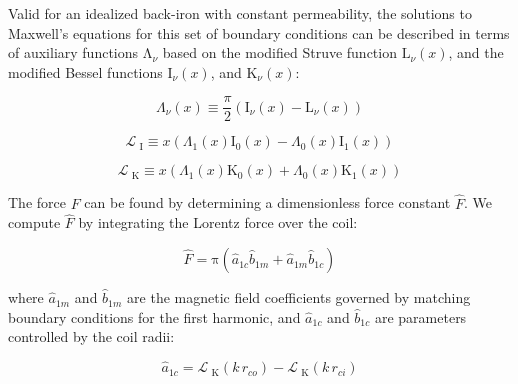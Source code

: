         Valid for an idealized back-iron with constant permeability, the solutions to Maxwell's equations for this set of boundary conditions can be described in terms of auxiliary functions ${\mathrm\Lambda}_{\nu}$ based on the modified Struve function ${\mathrm{L}_{\nu}}(x)$, and the modified Bessel functions ${\mathrm I}_{\nu}(x)$, and ${\mathrm K}_{\nu}(x)$:
        
        
        \begin{equation}
            {\Lambda_{\nu}}\left( x \right) \equiv \frac{\pi }{2}\left( {{\mathrm{I}_{\nu}}\left( x \right) - {\mathrm{L}_{\nu}}\left( x \right)} \right)
            \label{eq:Axiliary function}
        \end{equation}
        
        \begin{equation}
            {\mathcal{L}_{{\textrm{ I}}}} \equiv x\left( {{\Lambda _1}\left( x \right){\mathrm{I}_0}\left( x \right) - {\Lambda _0}\left( x \right){\mathrm{I}_1}\left( x \right)} \right)
            \label{eq:bessel function 1}
        \end{equation}
        
        \begin{equation}
            {\mathcal{L}_{{\textrm{ K}}}} \equiv x\left( {{\Lambda _1}\left( x \right){\mathrm{K}_0}\left( x \right) + {\Lambda _0}\left( x \right){\mathrm{K}_1}\left( x \right)} \right)
            \label{eq:bessel function 2}
        \end{equation}
        
        
        The force $F$ can be found by determining a dimensionless force constant $\hat F$. We compute $\hat F$ by integrating the Lorentz force over the coil:
        
        
        \begin{equation}
            \hat{F}=\mathrm\pi\left({\hat{a}}_{1c}{\hat{b}}_{1m}+{\hat{a}}_{1m}{\hat{b}}_{1c}\right)
            \label{eq:force dimless}
        \end{equation}
        
        
        where ${\hat a}_{1m}$ and ${\hat b}_{1m}$ are the magnetic field coefficients governed by matching boundary conditions for the first harmonic, and ${\hat a}_{1c}$ and ${\hat b}_{1c}$ are parameters controlled by the coil radii: 
        
        
        \begin{equation}
            \hat{a}_{1c}=\mathcal{L}_{\textrm{ K}}(k\,r_{co})-\mathcal{L}_{\textrm{ K}}(k\,r_{ci})
            \label{eq:a hat 1c}
        \end{equation}
        
